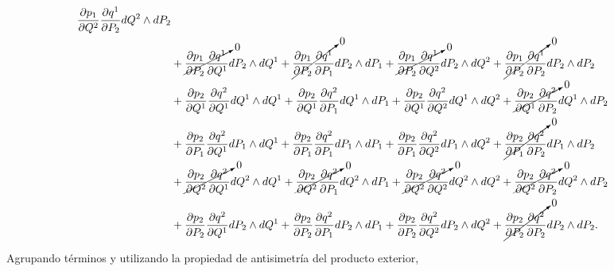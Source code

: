 \documentclass[a4paper,10pt]{article}
\numberwithin{equation}{section}
\begin{document}
\begin{align*}
 \frac{\partial p_1}{\partial Q^2}\frac{\partial q^1}{\partial P_2} dQ^2 \wedge dP_2 \\
 &+  \cancelto{0}{\frac{\partial p_1}{\partial P_2}\frac{\partial q^1}{\partial Q^1}} dP_2 \wedge dQ^1
 + \cancelto{0}{\frac{\partial p_1}{\partial P_2}\frac{\partial q^1}{\partial P_1}} dP_2 \wedge dP_1 + 
 \cancelto{0}{\frac{\partial p_1}{\partial P_2}\frac{\partial q^1}{\partial Q^2}} dP_2 \wedge dQ^2 + 
 \cancelto{0}{\frac{\partial p_1}{\partial P_2}\frac{\partial q^1}{\partial P_2}} dP_2 \wedge dP_2 \\
 &+ \frac{\partial p_2}{\partial Q^1}\frac{\partial q^2}{\partial Q^1}dQ^1 \wedge dQ^1 + 
 \frac{\partial p_2}{\partial Q^1}\frac{\partial q^2}{\partial P_1}dQ^1 \wedge dP_1 + 
 \frac{\partial p_2}{\partial Q^1}\frac{\partial q^2}{\partial Q^2}dQ^1 \wedge dQ^2 + 
 \cancelto{0}{\frac{\partial p_2}{\partial Q^1}\frac{\partial q^2}{\partial P_2}}dQ^1 \wedge dP_2 \\
 &+ \frac{\partial p_2}{\partial P_1}\frac{\partial q^2}{\partial Q^1} dP_1 \wedge dQ^1 +
 \frac{\partial p_2}{\partial P_1}\frac{\partial q^2}{\partial P_1} dP_1 \wedge dP_1 + 
 \frac{\partial p_2}{\partial P_1}\frac{\partial q^2}{\partial Q^2} dP_1 \wedge dQ^2 + 
 \cancelto{0}{\frac{\partial p_2}{\partial P_1}\frac{\partial q^2}{\partial P_2}} dP_1 \wedge dP_2 \\
 &+  \cancelto{0}{\frac{\partial p_2}{\partial Q^2}\frac{\partial q^2}{\partial Q^1}} dQ^2 \wedge dQ^1 
 + \cancelto{0}{\frac{\partial p_2}{\partial Q^2}\frac{\partial q^2}{\partial P_1}} dQ^2 \wedge dP_1 + 
 \cancelto{0}{\frac{\partial p_2}{\partial Q^2}\frac{\partial q^2}{\partial Q^2}} dQ^2 \wedge dQ^2 + 
 \cancelto{0}{\frac{\partial p_2}{\partial Q^2}\frac{\partial q^2}{\partial P_2}} dQ^2 \wedge dP_2 \\
 &+  \frac{\partial p_2}{\partial P_2}\frac{\partial q^2}{\partial Q^1} dP_2 \wedge dQ^1
 + \frac{\partial p_2}{\partial P_2}\frac{\partial q^2}{\partial P_1} dP_2 \wedge dP_1 + 
 \frac{\partial p_2}{\partial P_2}\frac{\partial q^2}{\partial Q^2} dP_2 \wedge dQ^2 + 
 \cancelto{0}{\frac{\partial p_2}{\partial P_2}\frac{\partial q^2}{\partial P_2}} dP_2 \wedge dP_2.
\end{align*}

Agrupando términos y utilizando la propiedad de antisimetría del producto exterior, 
\end{document}

